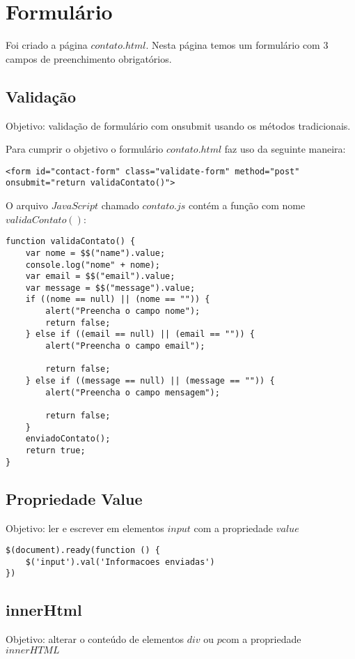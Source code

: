 \section{Formulário}
	Foi criado a página $contato.html$. Nesta página temos um formulário com $3$ campos de preenchimento obrigatórios.
	
\subsection{Validação}
	Objetivo: validação de formulário com onsubmit usando os métodos tradicionais.
	
	Para cumprir o objetivo o formulário $contato.html$ faz uso da seguinte maneira:
\begin{lstlisting}
<form id="contact-form" class="validate-form" method="post" onsubmit="return validaContato()">
\end{lstlisting}

	O arquivo $JavaScript$ chamado $contato.js$ contém a função com nome $validaContato()$:
\begin{lstlisting}
function validaContato() {
    var nome = $$("name").value;
    console.log("nome" + nome);
    var email = $$("email").value;
    var message = $$("message").value;
    if ((nome == null) || (nome == "")) {
        alert("Preencha o campo nome");
        return false;
    } else if ((email == null) || (email == "")) {
        alert("Preencha o campo email");

        return false;
    } else if ((message == null) || (message == "")) {
        alert("Preencha o campo mensagem");

        return false;
    }
    enviadoContato();
    return true;
}
\end{lstlisting}
	

\subsection{Propriedade Value}
	Objetivo: ler e escrever em elementos $input$ com a propriedade $value$
\begin{lstlisting}
$(document).ready(function () {
    $('input').val('Informacoes enviadas')
})
\end{lstlisting}


\subsection{innerHtml}
	Objetivo: alterar o conteúdo de elementos $div$ ou $p$com a propriedade $innerHTML$
	
